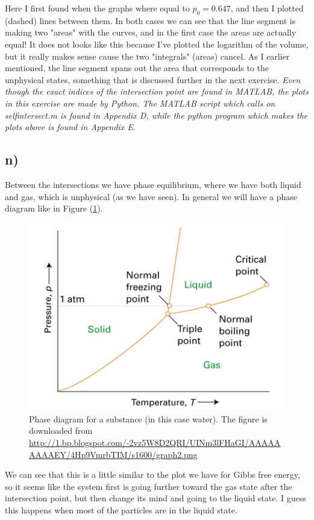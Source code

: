 \documentclass{scrartcl}
\begin{document}
Here I first found when the graphs where equal to $p_0=0.647$, and then I plotted (dashed) lines between them. In both cases we can see that the line segment is making two "areas" with the curves, and in the first case the areas are actually equal! It does not looks like this because I've plotted the logarithm of the volume, but it really makes sense cause the two "integrals" (areas) cancel. As I earlier mentioned, the line segment spans out the area that corresponds to the unphysical states, something that is discussed further in the next exercise. 
\newline\textit{Even though the exact indices of the intersection point are found in MATLAB, the plots in this exercise are made by Python. The MATLAB script which calls on selfintersect.m is found in Appendix D, while the python program which makes the plots above is found in Appendix E.}

\subsection*{n)}
Between the intersections we have phase equilibrium, where we have both liquid and gas, which is unphysical (as we have seen). In general we will have a phase diagram like in Figure (\ref{fig:n}).
\begin{figure}[H]
\centering
\includegraphics[width=150mm]{graph2.png}
\caption{Phase diagram for a substance (in this case water). The figure is downloaded from \url{ http://1.bp.blogspot.com/-2vz5W8D2QRI/UINm3lFHaGI/AAAAAAAAAEY/4Hp9VmrbTIM/s1600/graph2.png}}
\label{fig:n}
\end{figure}
We can see that this is a little similar to the plot we have for Gibbs free energy, so it seems like the system first is going further toward the gas state after the intersection point, but then change its mind and going to the liquid state. I guess this happens when most of the particles are in the liquid state.
\end{document}
